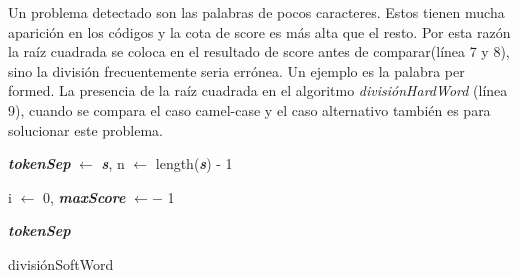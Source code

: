 \documentclass[a4paper,12pt]{report}
\begin{document}
Un problema detectado son las palabras de pocos caracteres. Estos tienen mucha aparición en los códigos y la cota de score es más alta que el resto. Por esta razón la raíz cuadrada se coloca en el resultado de score antes de comparar(línea 7 y 8), sino la división frecuentemente seria errónea. Un ejemplo es la palabra \textsf{per formed}. La presencia de la raíz cuadrada en el algoritmo \textit{divisiónHardWord} (línea 9), cuando se compara el caso camel-case y el caso alternativo también es para solucionar este problema.\\

\begin{algorithm}
\LinesNumbered%
\BlankLine%

\textbf{\textit{tokenSep}} $\leftarrow$ \textbf{\textit{s}}, n $\leftarrow$ length(\textbf{\textit{s}}) - 1

i $\leftarrow$ 0, \textbf{\textit{maxScore}} $\leftarrow -$ 1
\BlankLine

\BlankLine
\Return \textbf{\textit{tokenSep}}

\caption{divisiónSoftWord \label{ASW}}
\end{algorithm}
\end{document}

